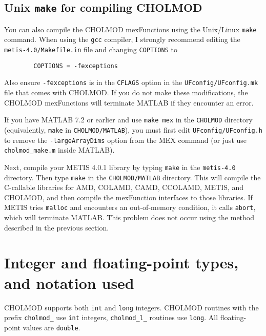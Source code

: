 \documentclass[11pt]{article}
\begin{document}
\subsection{Unix {\tt make} for compiling CHOLMOD}

You can also compile the CHOLMOD mexFunctions using the Unix/Linux {\tt make}
command.  When using the {\tt gcc} compiler, I strongly recommend editing the
{\tt metis-4.0/Makefile.in} file and changing {\tt COPTIONS} to
\begin{verbatim}
        COPTIONS = -fexceptions
\end{verbatim}
Also ensure {\tt -fexceptions} is in the {\tt CFLAGS} option in the
{\tt UFconfig/UFconfig.mk} file that comes with CHOLMOD.
If you do not make these modifications, the CHOLMOD mexFunctions
will terminate MATLAB if they encounter an error.

If you have MATLAB 7.2 or earlier and use {\tt make mex} in the
{\tt CHOLMOD} directory (equivalently, {\tt make} in {\tt CHOLMOD/MATLAB}),
you must first edit
{\tt UFconfig/UFconfig.h} to remove the {\tt -largeArrayDims}
option from the MEX command
(or just use {\tt cholmod\_make.m} inside MATLAB).

Next, compile your METIS 4.0.1 library by typing {\tt make} in the
{\tt metis-4.0} directory.  Then type {\tt make} in the {\tt CHOLMOD/MATLAB}
directory.  This will compile the C-callable libraries for
AMD, COLAMD, CAMD, CCOLAMD, METIS, and CHOLMOD, and then compile the
mexFunction interfaces to those libraries.
If METIS tries {\tt malloc} and encounters an out-of-memory condition,
it calls {\tt abort}, which will terminate MATLAB.  This problem does not
occur using the method described in the previous section.

\newpage \section{Integer and floating-point types, and notation used}

CHOLMOD supports both {\tt int} and {\tt long} integers.  CHOLMOD
routines with the prefix {\tt cholmod\_} use {\tt int} integers,
{\tt cholmod\_l\_} routines use {\tt long}.  All floating-point
values are {\tt double}.
\end{document}
